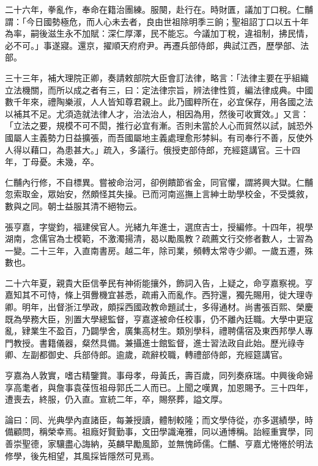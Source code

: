\begin{pinyinscope}
二十六年，拳亂作，奉命在籍治團練。服闋，赴行在。時財匱，議加丁口稅。仁黼謂：「今日國勢極危，而人心未去者，良由世祖除明季三餉；聖祖詔丁口以五十年為率，嗣後滋生永不加賦：深仁厚澤，民不能忘。今議加丁稅，違祖制，拂民情，必不可。」事遂寢。還京，擢順天府府尹。再遷兵部侍郎，典試江西，歷學部、法部。

三十三年，補大理院正卿，奏請敕部院大臣會訂法律，略言：「法律主要在乎組織立法機關，而所以成之者有三，曰：定法律宗旨，辨法律性質，編法律成典。中國數千年來，禮陶樂淑，人人皆知尊君親上。此乃國粹所在，必宜保存，用各國之法以補其不足。尤須造就法律人才，治法治人，相因為用，然後可收實效。」又言：「立法之要，規模不可不閎，推行必宜有漸。否則未當於人心而貿然以試，誠恐外國屬人主義勢力日益擴張，而吾國屬地主義處理愈形棼糾。有司奉行不善，反使外人得以藉口，為患甚大。」疏入，多議行。俄授吏部侍郎，充經筵講官。三十四年，丁母憂。未幾，卒。

仁黼內行修，不自標異。嘗被命治河，卻例饋節省金，同官懼，謂將興大獄。仁黼忽索取金，眾始安，然頗怪其失操。已而河南巡撫上言紳士助學校金，不受獎敘，數與之同。朝士益服其清不絕物云。

張亨嘉，字燮鈞，福建侯官人。光緒九年進士，選庶吉士，授編修。十四年，視學湖南，念儒官為士模範，不激濁揚清，曷以勵風教？疏薦文行交修者數人，士習為一變。二十三年，入直南書房。越二年，除司業，頻轉太常寺少卿。一歲五遷，殊數也。

二十六年夏，親貴大臣信拳民有神術能攘外，飾詞入告，上疑之，命亨嘉察視。亨嘉知其不可恃，條上弭釁機宜甚悉，疏甫入而亂作。西狩還，獨先賜用，徙大理寺卿。明年，出督浙江學政，頗採西國政教命題試士，多得通材。尚書張百熙、榮慶既為學務大臣，別置大學總監督，亨嘉遂被命任校事，仍不離內廷職。大學中更寇亂，肄業生不盈百，乃闢學舍，廣集高材生。類別學科，禮聘儒宿及東西邦學人專門教授。書籍儀器，粲然具備。兼攝進士館監督，進士習法政自此始。歷光祿寺卿、左副都御史、兵部侍郎。逾歲，疏辭校職，轉禮部侍郎，充經筵講官。

亨嘉為人敦實，嗜古精鑒賞。事母孝，母黃氏，壽百歲，同列奏庥瑞。中興後命婦享高耄者，與詹事袁葆恆祖母郭氏二人而已。上聞之嘆異，加恩賜予。三十四年，遭喪去，終服，仍入直。宣統二年，卒，賜祭葬，謚文厚。

論曰：同、光典學內直諸臣，每兼授讀，體制較隆；而文學侍從，亦多選績學，時備顧問，稱榮幸焉。祖廕好賢勤事，文田學識淹雅，同以通博稱。詒經重實學，同善崇聖德，家驤盡心誨納，英麟早勵風節，並無愧師儒。仁黼、亨嘉尤惓惓於明法修學，後先相望，其風採皆隱然可見焉。


\end{pinyinscope}